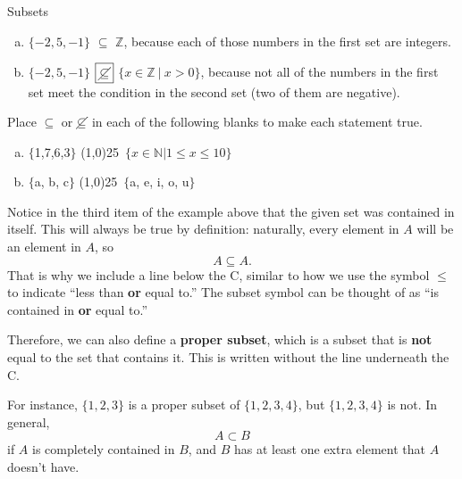 \begin{example}[https://www.youtube.com/watch?v=5n1TZYFCeYo&list=PLfmpjsIzhztuvrh-T2Owgo_gO84qypSBG&index=5]{Subsets}
\begin{enumerate}[(a)]
\item $\{-2,5,-1\}$ $\boxed{\subseteq}$ $\mathbb{Z}$, because each of those numbers in the first set are integers.\\

\item $\{-2,5,-1\}$ $\boxed{\cancel{\subseteq}}$ $\{x \in \mathbb{Z}\ |\ x > 0\}$, because not all of the numbers in the first set meet the condition in the second set (two of them are negative).
\end{enumerate}
\end{example}

\begin{try}
Place $\subseteq$ or $\cancel{\subseteq}$ in each of the following blanks to make each statement true.\\

\begin{enumerate}[(a)]
\item $\{$1,7,6,3$\}$ \line(1,0){25}\ $\{x \in \mathbb{N} | 1 \leq x \leq 10\}$\\

\item $\{$a, b, c$\}$ \line(1,0){25}\ $\{$a, e, i, o, u$\}$
\end{enumerate}
\end{try}

Notice in the third item of the example above that the given set was contained in itself.  This will always be true by definition: naturally, every element in $A$ will be an element in $A$, so \[A \subseteq A.\]  That is why we include a line below the C, similar to how we use the symbol $\leq$ to indicate ``less than \textbf{or} equal to.''  The subset symbol can be thought of as ``is contained in \textbf{or} equal to.''

Therefore, we can also define a \textbf{proper subset}, which is a subset that is \textbf{not} equal to the set that contains it.  This is written without the line underneath the C.

For instance, $\{1,2,3\}$ is a proper subset of $\{1,2,3,4\}$, but $\{1,2,3,4\}$ is not.  In general,
\[A \subset B\] if $A$ is completely contained in $B$, and $B$ has at least one extra element that $A$ doesn't have.
\pagebreak

